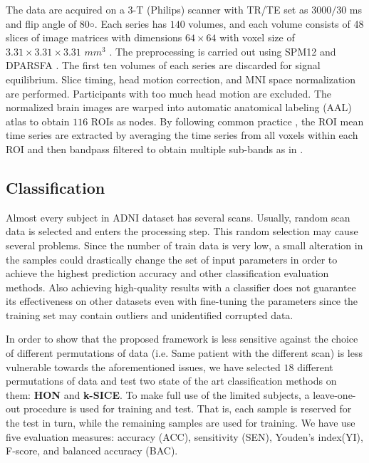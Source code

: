 \documentclass[preprint,12pt]{elsarticle}
\begin{document}
	The data are acquired on a $3$-T (Philips) scanner with TR/TE set as $3000/30$
	ms and flip angle of $80◦$. Each series has $140$ volumes, and each volume consists of 48 slices of image matrices with dimensions
	$64 \times 64$
	with voxel size of
	$ 3.31 \times  3.31 \times 3.31$
	$mm^3$ . The preprocessing is carried out using SPM12 and DPARSFA \cite{r64.5}. The
	first ten volumes of each series are discarded for signal equilibrium. Slice timing, head motion correction, and MNI space normalization are performed. Participants with too much head motion are excluded. The normalized brain images are warped into automatic anatomical labeling (AAL) \cite{r64.7} atlas to obtain $116$ ROIs as nodes. By following common practice \cite{n1, n2, n3}, the ROI mean time series are extracted by averaging the time series from all voxels within each ROI and then bandpass filtered to obtain multiple sub-bands as in \cite{n3}. 
	
	\subsection{Classification}
	
	Almost every subject in ADNI dataset has several scans. Usually, random scan data is selected and enters the processing step\cite{r14}. This random selection may cause several problems. Since the number of train data is very low, a small alteration in the samples could drastically change the set of input parameters in order to achieve the highest prediction accuracy and other classification evaluation methods. Also achieving high-quality results with a classifier does not guarantee its effectiveness on other datasets even with fine-tuning the parameters since the training set may contain outliers and unidentified corrupted data.
	
	In order to show that the proposed framework is less sensitive against the choice of different permutations of data (i.e. Same patient with the different scan) is less vulnerable towards the aforementioned issues, we have selected $18$ different permutations of data and test two state of the art classification methods on them: \textbf{HON} and \textbf{k-SICE}.   
	To make full use of the limited subjects, a leave-one-out procedure is used for training and test. That is, each sample is reserved for the test in turn, while the remaining samples are used for training.
	We have use five
	evaluation measures: accuracy (ACC), sensitivity (SEN), Youden’s index(YI), F-score, and balanced accuracy (BAC)\cite{r65}.
	
\end{document}
